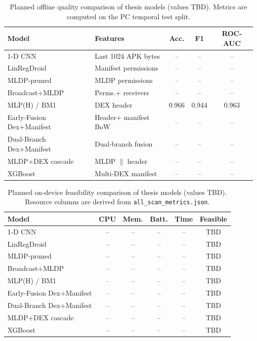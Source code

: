 \documentclass[conference]{IEEEtran}
\begin{document}
		\begin{table}[H]
			\caption{Planned offline quality comparison of thesis models (values TBD). Metrics are computed on the PC temporal test split.}
			\label{tab:offline-results}
			\centering
			\scriptsize
			\setlength{\tabcolsep}{3pt}
			\begin{tabular}{@{}l p{2.4cm} c c c@{}}
				\toprule
				\textbf{Model} & \textbf{Features} & \textbf{Acc.} & \textbf{F1} & \textbf{ROC-AUC} \\
				\midrule
				1-D CNN & Last 1024 APK bytes & -- & -- & -- \\
				LinRegDroid & Manifest permissions & -- & -- & -- \\
				MLDP-pruned & MLDP permissions & -- & -- & -- \\
				Broadcast+MLDP & Perms.+ receivers & -- & -- & -- \\
				MLP(H) / BM1 & DEX header & 0.966 & 0.944& 0.963 \\
				Early-Fusion Dex+Manifest & Header+ manifest BoW & -- & -- & -- \\
				Dual-Branch Dex+Manifest & Dual-branch fusion & -- & -- & -- \\
				MLDP+DEX cascade & MLDP $\parallel$ header & -- & -- & -- \\
				XGBoost & Multi-DEX manifest & -- & -- & -- \\
				\bottomrule
			\end{tabular}
		\end{table}
		
		\begin{table}[H]
			\caption{Planned on-device feasibility comparison of thesis models (values TBD). Resource columns are derived from \texttt{all\_scan\_metrics.json}.}
			\label{tab:device-results}
			\centering
			\scriptsize
			\setlength{\tabcolsep}{3pt}
			\begin{tabular}{@{}l c c c c c@{}}
				\toprule
				\textbf{Model} & \textbf{CPU} & \textbf{Mem.} & \textbf{Batt.} & \textbf{Time} & \textbf{Feasible} \\
				\midrule
				1-D CNN & -- & -- & -- & -- & TBD \\
				LinRegDroid & -- & -- & -- & -- & TBD \\
				MLDP-pruned & -- & -- & -- & -- & TBD \\
				Broadcast+MLDP & -- & -- & -- & -- & TBD \\
				MLP(H) / BM1 & -- & -- & -- & -- & TBD \\
				Early-Fusion Dex+Manifest & -- & -- & -- & -- & TBD \\
				Dual-Branch Dex+Manifest & -- & -- & -- & -- & TBD \\
				MLDP+DEX cascade & -- & -- & -- & -- & TBD \\
				XGBoost & -- & -- & -- & -- & TBD \\
				\bottomrule
			\end{tabular}
		\end{table}
		
\end{document}
